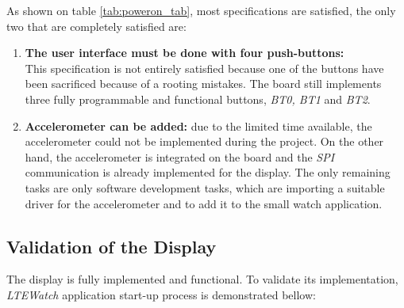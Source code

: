 \documentclass[Report.tex]{subfiles}
\begin{document}
As shown on table \ref{tab:poweron_tab}, most specifications are satisfied, the only two that are completely satisfied are:
\begin{enumerate}
\item \textbf{The user interface must be done with four push-buttons:}\\
This specification is not entirely satisfied because one of the buttons have been sacrificed because of a rooting mistakes. The board still implements three fully programmable and functional buttons, \textit{BT0, BT1} and \textit{BT2}.

\item \textbf{Accelerometer can be added:}
due to the limited time available, the accelerometer could not be implemented during the project. On the other hand, the accelerometer is integrated on the board and the \textit{SPI} communication is already implemented for the display. The only remaining tasks are only software development tasks, which are importing a suitable driver for the accelerometer and to add it to the small watch application.
\end{enumerate}

\pagebreak

\subsection{Validation of the Display}
The display is fully implemented and functional. To validate its implementation, \textit{LTEWatch} application start-up process is demonstrated bellow:
\end{document}
